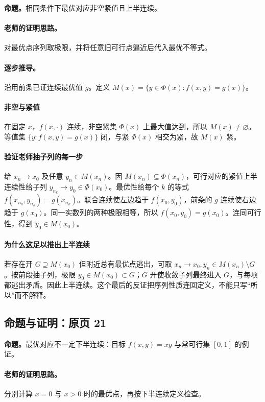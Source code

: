 \documentclass[11pt,a4paper]{article}
\theoremstyle{definition}\newtheorem{definition}{定义}\newtheorem{example}{例}
\begin{document}
\textbf{命题。}相同条件下最优对应非空紧值且上半连续。

\paragraph{老师的证明思路。}对最优点序列取极限，并将任意旧可行点逼近后代入最优不等式。

\paragraph{逐步推导。}
沿用前条已证连续最优值 $g$。定义 $M(x)=\{y\in\Phi(x):f(x,y)=g(x)\}$。
\paragraph{非空与紧值}在固定 $x$，$f(x,\cdot)$ 连续，非空紧集 $\Phi(x)$ 上最大值达到，所以 $M(x)\ne\varnothing$。等值集 $\{y:f(x,y)=g(x)\}$ 闭，与紧 $\Phi(x)$ 相交为紧，故 $M(x)$ 紧。
\paragraph{验证老师抽子列的每一步}给 $x_n\to x_0$ 及任意 $y_n\in M(x_n)$。因 $M(x_n)\subseteq\Phi(x_n)$，可行对应的紧值上半连续性给子列 $y_{n_k}\to y_0\in\Phi(x_0)$。最优性给每个 $k$ 的等式 $f(x_{n_k},y_{n_k})=g(x_{n_k})$。联合连续使左边趋于 $f(x_0,y_0)$，前条的 $g$ 连续使右边趋于 $g(x_0)$。同一实数列的两种极限相等，所以 $f(x_0,y_0)=g(x_0)$。连同可行性，得到 $y_0\in M(x_0)$。
\paragraph{为什么这足以推出上半连续}若存在开 $G\supseteq M(x_0)$ 但附近总有最优点逃出，可取 $x_n\to x_0,y_n\in M(x_n)\setminus G$。按前段抽子列，极限 $y_0\in M(x_0)\subset G$；$G$ 开使收敛子列最终进入 $G$，与每项都逃出矛盾。因此上半连续。这个最后的反证把序列性质连回定义，不能只写“所以”而不解释。


\subsection{命题与证明：原页 21}

\textbf{命题。}最优对应不一定下半连续：目标 $f(x,y)=xy$ 与常可行集 $[0,1]$ 的例证。

\paragraph{老师的证明思路。}分别计算 $x=0$ 与 $x>0$ 时的最优点，再按下半连续定义检查。
\end{document}
